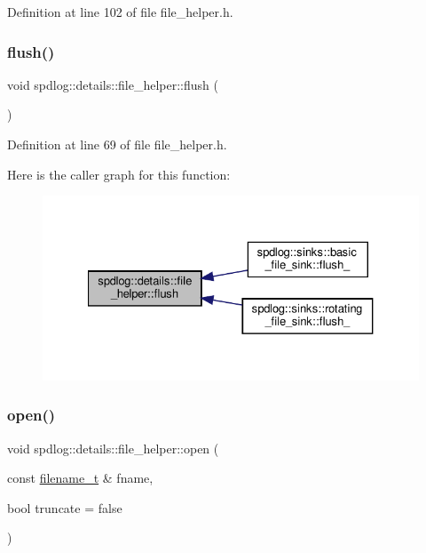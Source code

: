 Definition at line 102 of file file\+\_\+helper.\+h.

\mbox{\label{classspdlog_1_1details_1_1file__helper_a1a75f29ec0c13d9fbc269bcd8378b18b}} 
\subsubsection{\texorpdfstring{flush()}{flush()}}
{\footnotesize\ttfamily void spdlog\+::details\+::file\+\_\+helper\+::flush (\begin{DoxyParamCaption}{ }\end{DoxyParamCaption})\hspace{0.3cm}{\ttfamily [inline]}}



Definition at line 69 of file file\+\_\+helper.\+h.

Here is the caller graph for this function\+:
\nopagebreak
\begin{figure}[H]
\begin{center}
\leavevmode
\includegraphics[width=327pt]{classspdlog_1_1details_1_1file__helper_a1a75f29ec0c13d9fbc269bcd8378b18b_icgraph}
\end{center}
\end{figure}
\mbox{\label{classspdlog_1_1details_1_1file__helper_a8612066fd098080cc60e3aefed6a6085}} 
\subsubsection{\texorpdfstring{open()}{open()}}
{\footnotesize\ttfamily void spdlog\+::details\+::file\+\_\+helper\+::open (\begin{DoxyParamCaption}\item[{const \hyperlink{namespacespdlog_acf7ce125b3622e44f8f1702d699e0b06}{filename\+\_\+t} \&}]{fname,  }\item[{bool}]{truncate = {\ttfamily false} }\end{DoxyParamCaption})\hspace{0.3cm}{\ttfamily [inline]}}



